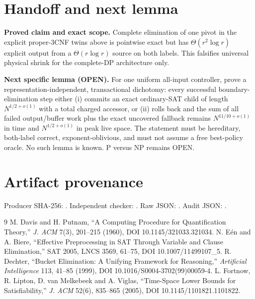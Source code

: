 \documentclass[11pt]{article}
\begin{document}
\section{Handoff and next lemma}
\textbf{Proved claim and exact scope.}  Complete elimination of one pivot in
the explicit proper-3CNF twins above is pointwise exact but has
$\Theta(r^2\log r)$ explicit output from a $\Theta(r\log r)$ source on both
labels.  This falsifies universal physical shrink for the complete-DP
architecture only.

\textbf{Next specific lemma (OPEN).}  For one uniform all-input controller,
prove a representation-independent, transactional dichotomy: every successful
boundary-elimination step either (i) commits an exact ordinary-SAT child of
length $N^{1/2+o(1)}$ with a total charged accessor, or (ii) rolls back and the
sum of all failed output/buffer work plus the exact uncovered fallback remains
$N^{11/10+o(1)}$ in time and $N^{1/2+o(1)}$ in peak live space.  The statement
must be hereditary, both-label correct, exponent-oblivious, and must not assume
a free best-policy oracle.  No such lemma is known.  P versus NP remains OPEN.

\section*{Artifact provenance}
Producer SHA-256:
.
Independent checker:
.
Raw JSON:
.
Audit JSON:
.

\begin{thebibliography}{9}
 M. Davis and H. Putnam,
``A Computing Procedure for Quantification Theory,''
\emph{J. ACM} 7(3), 201--215 (1960), DOI 10.1145/321033.321034.
 N. E\'en and A. Biere,
``Effective Preprocessing in SAT Through Variable and Clause Elimination,''
SAT 2005, LNCS 3569, 61--75, DOI 10.1007/11499107\_5.
 R. Dechter,
``Bucket Elimination: A Unifying Framework for Reasoning,''
\emph{Artificial Intelligence} 113, 41--85 (1999),
DOI 10.1016/S0004-3702(99)00059-4.
 L. Fortnow, R. Lipton, D. van Melkebeek and A. Viglas,
``Time-Space Lower Bounds for Satisfiability,''
\emph{J. ACM} 52(6), 835--865 (2005), DOI 10.1145/1101821.1101822.
\end{thebibliography}
\end{document}
